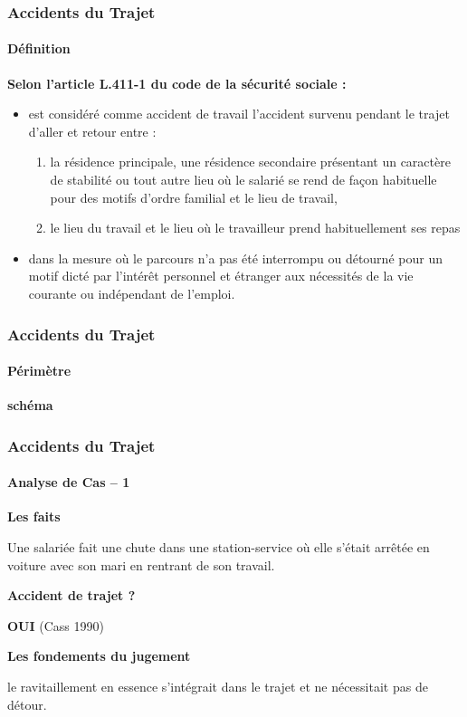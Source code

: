 \documentclass{beamer}
\begin{document}
\begin{frame}
\frametitle{Accidents du Trajet}
\framesubtitle{Définition}

\textbf{Selon l’article L.411-1 du code de la sécurité sociale :}

\begin{itemize}
    \item est considéré comme accident de travail l’accident survenu pendant le trajet d’aller et retour entre : 
\begin{enumerate}
\item la résidence principale, une résidence secondaire présentant un caractère de stabilité ou tout autre lieu où le salarié se rend de façon habituelle pour des motifs d’ordre familial et le lieu de travail,
\item le lieu du travail et le lieu où le travailleur prend habituellement ses repas
\end{enumerate}
\item dans la mesure où le parcours n’a pas été interrompu ou détourné pour un motif dicté par l’intérêt personnel et étranger aux nécessités de la vie courante ou indépendant de l’emploi. 
\end{itemize}
\end{frame}



\begin{frame}
\frametitle{Accidents du Trajet}
\framesubtitle{Périmètre}

\textbf{schéma}
\end{frame}

\begin{frame}
\frametitle{Accidents du Trajet}
\framesubtitle{Analyse de Cas – 1}

\textbf{Les faits}

Une salariée fait une chute dans une station-service où elle s’était arrêtée en voiture avec son mari en rentrant de son travail.


\textbf{Accident de trajet ? }

\textbf{OUI} (Cass 1990)

\textbf{Les fondements du jugement}

le ravitaillement en essence s’intégrait dans le trajet et ne nécessitait pas de détour.
\end{frame}
\end{document}
